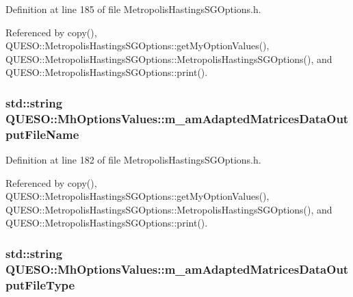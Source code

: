Definition at line 185 of file Metropolis\-Hastings\-S\-G\-Options.\-h.



Referenced by copy(), Q\-U\-E\-S\-O\-::\-Metropolis\-Hastings\-S\-G\-Options\-::get\-My\-Option\-Values(), Q\-U\-E\-S\-O\-::\-Metropolis\-Hastings\-S\-G\-Options\-::\-Metropolis\-Hastings\-S\-G\-Options(), and Q\-U\-E\-S\-O\-::\-Metropolis\-Hastings\-S\-G\-Options\-::print().

\hypertarget{class_q_u_e_s_o_1_1_mh_options_values_ad131a1b5617e040b7602fbd6bf4a600e}{
\subsubsection[{m\-\_\-am\-Adapted\-Matrices\-Data\-Output\-File\-Name}]{\setlength{\rightskip}{0pt plus 5cm}std\-::string Q\-U\-E\-S\-O\-::\-Mh\-Options\-Values\-::m\-\_\-am\-Adapted\-Matrices\-Data\-Output\-File\-Name}}\label{class_q_u_e_s_o_1_1_mh_options_values_ad131a1b5617e040b7602fbd6bf4a600e}


Definition at line 182 of file Metropolis\-Hastings\-S\-G\-Options.\-h.



Referenced by copy(), Q\-U\-E\-S\-O\-::\-Metropolis\-Hastings\-S\-G\-Options\-::get\-My\-Option\-Values(), Q\-U\-E\-S\-O\-::\-Metropolis\-Hastings\-S\-G\-Options\-::\-Metropolis\-Hastings\-S\-G\-Options(), and Q\-U\-E\-S\-O\-::\-Metropolis\-Hastings\-S\-G\-Options\-::print().

\hypertarget{class_q_u_e_s_o_1_1_mh_options_values_a2aeb0e38d87c86464af4bde6a202598a}{
\subsubsection[{m\-\_\-am\-Adapted\-Matrices\-Data\-Output\-File\-Type}]{\setlength{\rightskip}{0pt plus 5cm}std\-::string Q\-U\-E\-S\-O\-::\-Mh\-Options\-Values\-::m\-\_\-am\-Adapted\-Matrices\-Data\-Output\-File\-Type}}\label{class_q_u_e_s_o_1_1_mh_options_values_a2aeb0e38d87c86464af4bde6a202598a}


